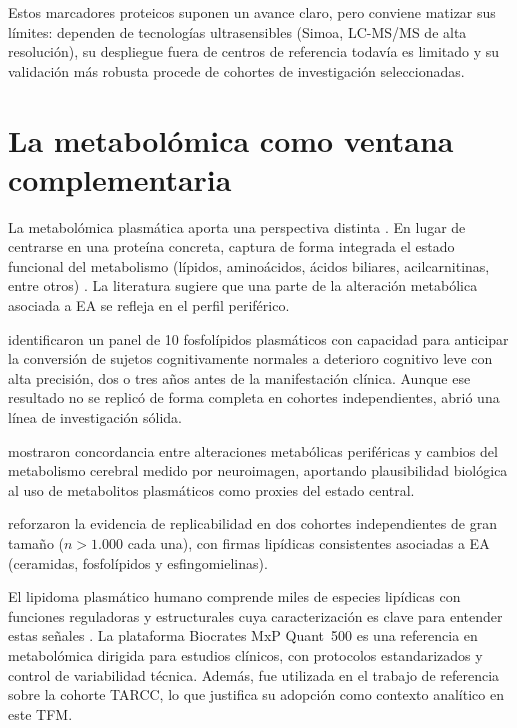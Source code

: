 Estos marcadores proteicos suponen un avance claro, pero conviene matizar sus límites: dependen de tecnologías ultrasensibles (Simoa, LC-MS/MS de alta resolución), su despliegue fuera de centros de referencia todavía es limitado y su validación más robusta procede de cohortes de investigación seleccionadas.

\section{La metabolómica como ventana complementaria}

La metabolómica plasmática aporta una perspectiva distinta \parencite{fiehn2016metabolomics}. En lugar de centrarse en una proteína concreta, captura de forma integrada el estado funcional del metabolismo (lípidos, aminoácidos, ácidos biliares, acilcarnitinas, entre otros) \parencite{thevenot2015analysis}. La literatura sugiere que una parte de la alteración metabólica asociada a EA se refleja en el perfil periférico.

\textcite{mapstone2014plasma} identificaron un panel de 10 fosfolípidos plasmáticos con capacidad para anticipar la conversión de sujetos cognitivamente normales a deterioro cognitivo leve con alta precisión, dos o tres años antes de la manifestación clínica. Aunque ese resultado no se replicó de forma completa en cohortes independientes, abrió una línea de investigación sólida.

\textcite{varma2018brain} mostraron concordancia entre alteraciones metabólicas periféricas y cambios del metabolismo cerebral medido por neuroimagen, aportando plausibilidad biológica al uso de metabolitos plasmáticos como proxies del estado central.

\textcite{huynh2020concordant} reforzaron la evidencia de replicabilidad en dos cohortes independientes de gran tamaño ($n > 1.000$ cada una), con firmas lipídicas consistentes asociadas a EA (ceramidas, fosfolípidos y esfingomielinas).

El lipidoma plasmático humano comprende miles de especies lipídicas con funciones reguladoras y estructurales cuya caracterización es clave para entender estas señales \parencite{quehenberger2011human,wenk2010lipidomics}. La plataforma Biocrates MxP Quant~500 \parencite{biocrates2020} es una referencia en metabolómica dirigida para estudios clínicos, con protocolos estandarizados y control de variabilidad técnica. Además, fue utilizada en el trabajo de referencia \parencite{bernal2025metabolomics} sobre la cohorte TARCC, lo que justifica su adopción como contexto analítico en este TFM.

